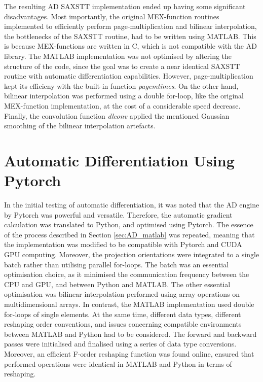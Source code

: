 The resulting AD SAXSTT implementation ended up having some significant disadvantages.
Most importantly, the original MEX-function routines implemented to efficiently perform page-multiplication and bilinear interpolation, the bottlenecks of the SAXSTT routine, had to be written using MATLAB.
This is because MEX-functions are written in C, which is not compatible with the AD library.
The MATLAB implementation was not optimised by altering the structure of the code, since the goal was to create a near identical SAXSTT routine with automatic differentiation capabilities.
However, page-multiplication kept its efficieny with the built-in function \emph{pagemtimes}.
On the other hand, bilinear interpolation was performed using a double for-loop, like the original MEX-function implementation, at the cost of a considerable speed decrease.
Finally, the convolution function \emph{dlconv} applied the mentioned Gaussian smoothing of the bilinear interpolation artefacts.


\section{Automatic Differentiation Using Pytorch}\label{sec:AD_pytorch}

In the initial testing of automatic differentiation, it was noted that the AD engine by Pytorch was powerful and versatile.
Therefore, the automatic gradient calculation was translated to Python, and optimised using Pytorch.
The essence of the process described in Section \ref{sec:AD_matlab} was repeated,
meaning that the implementation was modified to be compatible with Pytorch and CUDA GPU computing.
Moreover, the projection orientations were integrated to a single batch rather than utilising parallel for-loops.
The batch was an essential optimisation choice, as it minimised the communication frequency between the CPU and GPU, and between Python and MATLAB.
The other essential optimisation was bilinear interpolation performed using array operations on multidimensional arrays.
In contrast, the MATLAB implementation used double for-loops of single elements.
At the same time, different data types, different reshaping order conventions, and issues concerning compatible environments between MATLAB and Python had to be considered.
The forward and backward passes were initialised and finalised using a series of data type conversions.
Moreover, an efficient F-order reshaping function was found online, ensured that performed operations were identical in MATLAB and Python in terms of reshaping.

